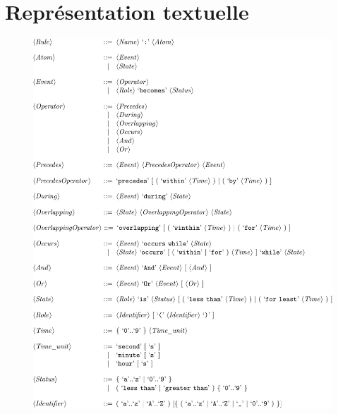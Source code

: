 \section*{Représentation textuelle}
\begin{figure}
  \centering
  \includegraphics[scale=.8]{gfx/bnftext.pdf}
  \label{fig:bnf1}
\end{figure}
